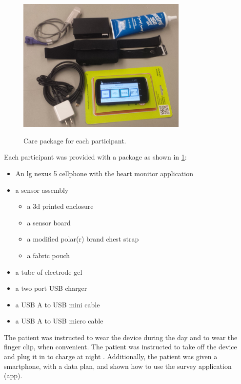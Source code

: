 \begin{figure}
 \begin{center}
  \label{fig:CarePackage}
  \includegraphics[scale=1,width=0.75\textwidth]{Images/carePackage.png} 
  \caption{Care package for each participant.} 
 \end{center}
\end{figure}



Each participant was provided with a package as shown in \cref{fig:CarePackage}:
\begin{itemize}
\item An lg nexus 5 cellphone with the heart monitor application
\item a sensor assembly
	\begin{itemize}
	\item a 3d printed enclosure
	\item a sensor board
	\item a modified polar(r) brand chest strap
	\item a fabric pouch
	\end{itemize}
\item a tube of electrode gel
\item a two port USB charger
\item a USB A to USB mini cable
\item a USB A to USB micro cable
\end{itemize}

The patient was instructed to wear the device during the day and to wear the finger clip, when convenient. The patient was instructed to take off the device and plug it in to charge at night . Additionally, the patient was given a smartphone, with a data plan, and shown how to use the survey application (app). 

